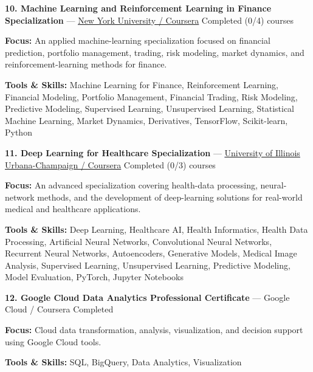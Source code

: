 \documentclass[9pt,letterpaper]{extarticle}
\begin{document}
\vspace{2pt}
\noindent\textbf{10. Machine Learning and Reinforcement Learning in Finance Specialization} {\small --- \textcolor{blue}{\underline{\href{https://www.coursera.org/specializations/machine-learning-reinforcement-finance}{New York University / Coursera}}} \textbar{} Completed (0/4) courses}\par
\textbf{Focus:} An applied machine-learning specialization focused on financial prediction, portfolio management, trading, risk modeling, market dynamics, and reinforcement-learning methods for finance.\par
{\small\textbf{Tools \& Skills:} Machine Learning for Finance, Reinforcement Learning, Financial Modeling, Portfolio Management, Financial Trading, Risk Modeling, Predictive Modeling, Supervised Learning, Unsupervised Learning, Statistical Machine Learning, Market Dynamics, Derivatives, TensorFlow, Scikit-learn, Python\par}
\vspace{2pt}
\noindent\textbf{11. Deep Learning for Healthcare Specialization} {\small --- \textcolor{blue}{\underline{\href{https://www.coursera.org/specializations/deep-learning-healthcare}{University of Illinois Urbana-Champaign / Coursera}}} \textbar{} Completed (0/3) courses}\par
\textbf{Focus:} An advanced specialization covering health-data processing, neural-network methods, and the development of deep-learning solutions for real-world medical and healthcare applications.\par
{\small\textbf{Tools \& Skills:} Deep Learning, Healthcare AI, Health Informatics, Health Data Processing, Artificial Neural Networks, Convolutional Neural Networks, Recurrent Neural Networks, Autoencoders, Generative Models, Medical Image Analysis, Supervised Learning, Unsupervised Learning, Predictive Modeling, Model Evaluation, PyTorch, Jupyter Notebooks\par}
\vspace{2pt}
\noindent\textbf{12. Google Cloud Data Analytics Professional Certificate} {\small --- Google Cloud / Coursera \textbar{} Completed}\par
\textbf{Focus:} Cloud data transformation, analysis, visualization, and decision support using Google Cloud tools.\par
{\small\textbf{Tools \& Skills:} SQL, BigQuery, Data Analytics, Visualization\par}
\end{document}
